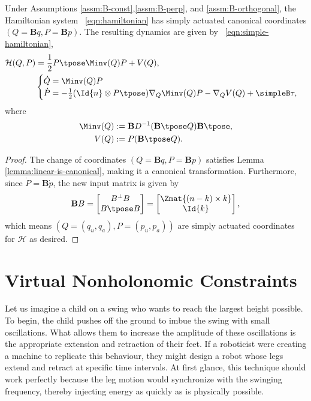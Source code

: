 \begin{thm}\label{thm:simply-actuated}
    Under Assumptions \ref{assm:B-const},\ref{assm:B-perp}, and
    \ref{assm:B-orthogonal}, the Hamiltonian system ~\eqref{eqn:hamiltonian}
    has simply actuated canonical coordinates 
    \(\left(Q = \mathbf{B}q, P = \mathbf{B}p\right)\). The resulting dynamics are 
    given by ~\eqref{eqn:simple-hamiltonian},
    \begin{align}\label{eqn:simple-hamiltonian}
        \mathcal{H}(Q,P) &= 
        \frac{1}{2} P\tpose \Minv(Q) P + V(Q)
        , \\
       &\begin{cases}
            \dot{Q} = \Minv(Q)P \\
            \dot{P} = -\frac{1}{2} (\Id{n} \otimes P\tpose) \nabla_Q \Minv(Q) P
                - \nabla_Q V(Q) + \simpleB \tau
            ,
        \end{cases} \nonumber
    \end{align}
    where
    \begin{align*}
        \Minv(Q) &:= \mathbf{B}D^{-1}(\mathbf{B}\tpose Q)\mathbf{B}\tpose
        , \\
        V(Q) &:= P(\mathbf{B}\tpose Q)
        .
    \end{align*}
\end{thm}
\begin{proof}
    The change of coordinates \((Q = \mathbf{B}q, P = \mathbf{B}p)\)
    satisfies Lemma \ref{lemma:linear-is-canonical}, making it a canonical
    transformation.
    Furthermore, since \(\dot{P} = \mathbf{B}\dot{p}\), the new input matrix is
    given by 
    \[
        \mathbf{B}B = \begin{bmatrix}
            B^\perp B \\
            B\tpose B \\
        \end{bmatrix} = 
        \begin{bmatrix}
            \Zmat{(n-k)\times k} \\
            \Id{k}
        \end{bmatrix}
        ,
    \]
    which means \(\left(Q = (q_u,q_a), P = (p_u,p_a)\right)\) are simply
    actuated coordinates for \(\mathcal{H}\) as desired.
\end{proof}

\section{Virtual Nonholonomic Constraints}
Let us imagine a child on a swing who wants to reach the largest height
possible. 
To begin, the child pushes off the ground to imbue the swing with small oscillations.
What allows them to increase the amplitude of these oscillations is the
appropriate extension and retraction of their feet.
If a roboticist were creating a machine to replicate this behaviour, they might
design a robot whose legs extend and retract at specific time intervals. 
At first glance, this technique should work perfectly because the leg motion
would synchronize with the swinging frequency, thereby injecting energy as
quickly as is physically possible.

